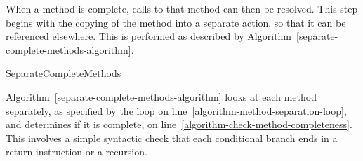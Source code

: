 When a method is complete, calls to that method can then be resolved.
This step begins with the copying of the method into a separate
action, so that it can be referenced elsewhere.
This is performed as described by
Algorithm~\ref{separate-complete-methods-algorithm}.
\begin{algorithm}
  \begin{algorithmic}[1]
     \label{algorithm-method-separation-loop}
     \label{algorithm-check-method-completeness}
    \State {}
    \label{algorithm-introduce-class-information}
    \State {} \label{algorithm-introduce-method-action}
    \State {} \label{algorithm-copy-method-action}
    \EndIf
    \EndFor
  \end{algorithmic}
  \caption{SeparateCompleteMethods}
  \label{separate-complete-methods-algorithm}
\end{algorithm}

Algorithm~\ref{separate-complete-methods-algorithm} looks at each
method separately, as specified by the loop on
line~\ref{algorithm-method-separation-loop}, and determines if it is
complete, on line~\ref{algorithm-check-method-completeness}.
This involves a simple syntactic check that each conditional branch
ends in a return instruction or a recursion.

